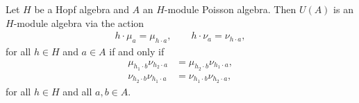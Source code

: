 \documentclass[10pt,a4paper]{amsart}
\begin{document}
\begin{theorem}\label{thm.enveloping}
Let $H$ be a Hopf algebra and $A$ an $H$-module Poisson algebra.
Then $U(A)$ is an $H$-module algebra via the action
\begin{align}\label{eq.hopf_ext}
	h \cdot \mu_a = \mu_{h \cdot a}, \qquad 
    h \cdot \nu_a = \nu_{h \cdot a},
\end{align}
for all $h \in H$ and $a \in A$ if and only if 
\begin{align}
\label{eq.hopf_ext_cond1}
\mu_{h_1 \cdot b}\nu_{h_2 \cdot a} &= \mu_{h_2 \cdot b} \nu_{h_1 \cdot a}, \\
\label{eq.hopf_ext_cond2}
\nu_{h_2 \cdot b}\nu_{h_1 \cdot a} &= \nu_{h_1 \cdot b}\nu_{ h_2 \cdot a},
\end{align}
for all $h \in H$ and all $a,b \in A$.
\end{theorem}
\end{document}
